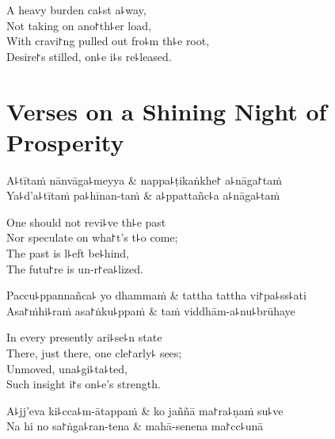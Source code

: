 \begin{english}
  A heavy burden ca꜕st a꜕way,\\
  Not taking on ano꜓th꜕er load,\\
  With cravi꜓ng pulled out fro꜕m th꜕e root,\\
  Desire꜓s stilled, on꜕e i꜕s re꜕leased.
\end{english}

\chapter{Verses on a Shining Night of Prosperity}%


\begin{leader}
\end{leader}

\begin{twochants}
  A꜕tītaṁ nānvāga꜕meyya & nappa꜕ṭikaṅkhe꜓ a꜕nāga꜓taṁ \\
  Ya꜕d'a꜕tītaṁ pa꜕hīnan-taṁ & a꜕ppattañc꜕a a꜕nāga꜕taṁ \\
\end{twochants}

\begin{english}
  One should not revi꜕ve th꜕e past\\
  Nor speculate on wha꜓t's t꜕o come;\\
  The past is l꜕eft be꜕hind,\\
  The futu꜓re is un-r꜓ea꜕lized.
\end{english}

\begin{twochants}
  Paccu꜕ppannañca꜕ yo dhammaṁ & tattha tattha vi꜓pa꜕ss꜕ati \\
  Asa꜓ṁhi꜕raṁ asa꜓ṅku꜕ppaṁ & taṁ viddhām-a꜕nu꜕brūhaye \\
\end{twochants}

\begin{english}
  In every presently ari꜕se꜕n state\\
  There, just there, one cle꜓arly꜕ sees;\\
  Unmoved, una꜕gi꜕ta꜕ted,\\
  Such insight i꜓s on꜕e's strength.
\end{english}

\begin{twochants}
  A꜕jj'eva ki꜕cca꜕m-ātappaṁ & ko jaññā ma꜓ra꜕ṇaṁ su꜕ve \\
  Na hi no sa꜓ṅga꜕ran-tena & mahā-senena ma꜓cc꜕unā \\
\end{twochants}

